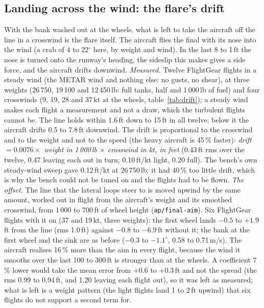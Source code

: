 \documentclass[10pt,a4paper,twocolumn]{article}
\begin{document}
\subsection{Landing across the wind: the flare's drift}\label{sec:drift}
With the bank washed out at the wheels, what is left to take the aircraft off the line in a crosswind is the flare itself. The aircraft flies the final with its nose into the wind (a crab of 4 to 22$^\circ$ here, by weight and wind). In the last 8 to 1\,ft the nose is turned onto the runway's heading, the sideslip this makes gives a side force,
and the aircraft drifts downwind. \emph{Measured.} Twelve FlightGear flights in a steady wind (the METAR wind and nothing else: no gusts, no shear), at three weights (26\,750, 19\,100 and 12\,450\,lb: full tanks, half and 1\,000\,lb of fuel) and four crosswinds (9, 19, 28 and 37\,kt at the wheels, table~\ref{tab:drift});
a steady wind makes each flight a measurement and not a draw, which the turbulent flights cannot be. The line holds within 1.6\,ft down to 15\,ft in all twelve; below it the aircraft drifts 0.5 to 7.8\,ft downwind. The drift is proportional to the crosswind and to the weight and not to the speed
(the heavy aircraft is 45\,\% faster): \emph{drift $=0.0076\times$ weight in 1\,000\,lb $\times$ crosswind in kt, in feet} (0.43\,ft rms over the twelve, 0.47 leaving each out in turn; 0.10\,ft/kt light, 0.20 full). The bench's own steady-wind sweep gave 0.12\,ft/kt at 26\,750\,lb: it had 40\,\% too little drift, which is why the bench could
not be tuned on and the flights had to be flown. \emph{The offset.} The line that the lateral loops steer to is moved upwind by the same amount, worked out in flight from the aircraft's weight and its smoothed crosswind, from 1\,000 to 700\,ft of wheel height (\texttt{ap/final-aim}). Six FlightGear flights with it on
(37 and 19\,kt, three weights): the first wheel lands $-0.5$ to $+1.9$\,ft from the line (rms 1.0\,ft) against $-0.8$ to $-6.9$\,ft without it; the bank at the first wheel and the sink are as before ($-0.3$ to $-1.1^\circ$, 0.58 to 0.71\,m/s). The aircraft realises 16\,\% more than the aim in every flight, because the wind
it smooths over the last 100 to 300\,ft is stronger than at the wheels. A coefficient 7\,\% lower would take the mean error from $+0.6$ to $+0.3$\,ft and not the spread (the rms 0.99 to 0.94\,ft, and 1.20 leaving each flight out), so it was left as measured; what is left is a weight pattern (the light flights land 1 to 2\,ft upwind) that six flights do not support a second term for.
\end{document}
